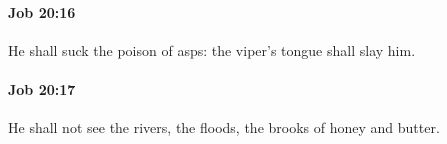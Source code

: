 		\paragraph{Job 20:16} %
			\label{JOB-20-16}

			He shall suck the poison of asps: the viper’s tongue shall slay him.


		\paragraph{Job 20:17} %
			\label{JOB-20-17}

			He shall not see the rivers, the floods, the brooks of honey and butter.


